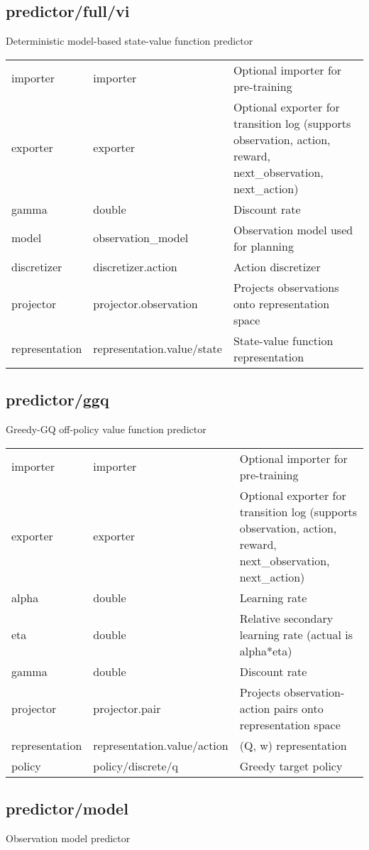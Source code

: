 \subsection{predictor/full/vi}
\noindent Deterministic model-based state-value function predictor\\

\noindent\begin{tabular}{@{}lll@{}}
importer&importer&Optional importer for pre-training\\
exporter&exporter&Optional exporter for transition log (supports observation, action, reward, next\_observation, next\_action)\\
gamma&double&Discount rate\\
model&observation\_model&Observation model used for planning\\
discretizer&discretizer.action&Action discretizer\\
projector&projector.observation&Projects observations onto representation space\\
representation&representation.value/state&State-value function representation\\
\end{tabular}
\subsection{predictor/ggq}
\noindent Greedy-GQ off-policy value function predictor\\

\noindent\begin{tabular}{@{}lll@{}}
importer&importer&Optional importer for pre-training\\
exporter&exporter&Optional exporter for transition log (supports observation, action, reward, next\_observation, next\_action)\\
alpha&double&Learning rate\\
eta&double&Relative secondary learning rate (actual is alpha*eta)\\
gamma&double&Discount rate\\
projector&projector.pair&Projects observation-action pairs onto representation space\\
representation&representation.value/action&(Q, w) representation\\
policy&policy/discrete/q&Greedy target policy\\
\end{tabular}
\subsection{predictor/model}
\noindent Observation model predictor\\


